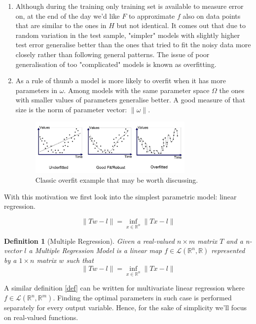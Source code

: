 \documentclass[a4paper]{article}
\theoremstyle{break}
\newtheorem{definition}{Definition}[section]
\newcommand{\R}{\mathbb{R}}
\begin{document}
\begin{enumerate}
    \item Although during the training only training set is available to measure error on, at the end of the day we'd like $F$ to approximate $f$ also on data points that are similar to the ones in $H$ but not identical.
    It comes out that due to random variation in the test sample, "simpler" models with slightly higher test error generalise better than the ones that tried to fit the noisy data more closely rather than following general patterns. The issue of poor generalisation of too "complicated" models is known as overfitting.
    
    \item As a rule of thumb a model is more likely to overfit when it has more parameters in $ \omega $. Among models with the same parameter space $ \Omega $ the ones with smaller values of parameters generalise better. A good measure of that size is the norm of parameter vector: $ \| \omega \| $.
\begin{figure}[!htbp]
\begin{center}
    \includegraphics[width=8cm]{overfit_poly.png}
\end{center}
\caption{Classic overfit example that may be worth discussing.}\label{overfit}
\end{figure} 
    
\end{enumerate}

With this motivation we first look into the simplest parametric model: linear regression.

\begin{equation}
    \label{def}
        \| T w - l \| = \inf\limits_{x \in \R^n} \| T x - l \|
\end{equation}
    
\begin{definition}[Multiple Regression]
    Given a real-valued $ n \times m$ matrix $T$ and a n-vector $l$ a Multiple Regression Model is a linear map $f \in \mathcal{L} ( \R ^n, \R)$ represented by a $ 1 \times n$ matrix $w$ such that
    \begin{equation}\label{def2}
        \| T w - l \| = \inf\limits_{x \in \R^n} \| T x - l \|
    \end{equation}
\end{definition}
A similar definition \ref{def} can be written for multivariate linear regression where $ f \in \mathcal{L} ( \R ^n, \R^m)$. Finding the optimal parameters in such case is performed separately for every output variable. Hence, for the sake of simplicity we'll focus on real-valued functions.
\end{document}
